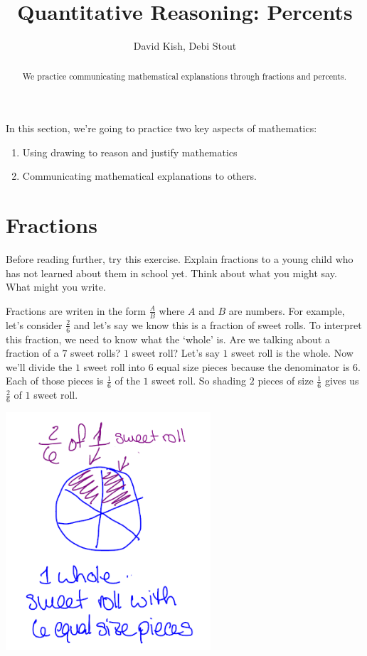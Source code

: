 \documentclass{ximera}
\author{David Kish, Debi Stout}
\title{Quantitative Reasoning: Percents}
\begin{document}
\begin{abstract}
We practice communicating mathematical explanations through fractions and percents.
\end{abstract}
\maketitle


In this section, we're going to practice two key aspects of mathematics: 
\begin{enumerate}
\item Using drawing to reason and justify mathematics
\item Communicating mathematical explanations to others.
\end{enumerate}

\section{Fractions}

\begin{exploration}
Before reading further, try this exercise.  Explain fractions to a young child who has not learned about them in school yet.  Think about what you might say.  What might you write.
\end{exploration}

Fractions are writen in the form $\frac{A}{B}$ where $A$ and $B$ are numbers. For example, let's consider $\frac{2}{6}$ and let's say we know this is a fraction of sweet rolls.  To interpret this fraction, we need to know what the `whole' is.   Are we talking about a fraction of a $7$ sweet rolls? $1$ sweet roll? Let's say $1$ sweet roll is the whole. Now we'll divide the $1$ sweet roll into $6$ equal size pieces because the denominator is $6$. Each of those pieces is $\frac{1}{6}$ of the $1$ sweet roll. So shading $2$ pieces of size $\frac{1}{6}$ gives us $\frac{2}{6}$ of $1$ sweet roll.

\begin{image}
    \includegraphics[width=3in]{fractionpic.png}
\end{image}
\end{document}
